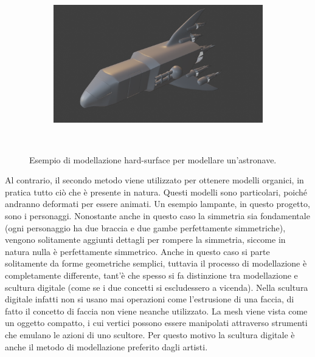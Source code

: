 \begin{figure}
\begin{subfigure}{.5\textwidth}
\end{subfigure}%
\begin{subfigure}{.5\textwidth}
  \centering
  \includegraphics[width=.99\linewidth]{Figures/box4.png}
\end{subfigure}\\[2ex]
\decoRule
\caption[Modellazione hard-surface]{Esempio di modellazione hard-surface per modellare un'astronave.}
\label{fig:box-model}
\end{figure}

Al contrario, il secondo metodo viene utilizzato per ottenere modelli organici, in pratica tutto ciò che è presente in natura.
Questi modelli sono particolari, poiché andranno deformati per essere animati.
Un esempio lampante, in questo progetto, sono i personaggi.
Nonostante anche in questo caso la simmetria sia fondamentale (ogni personaggio ha due braccia e due gambe perfettamente simmetriche), vengono solitamente aggiunti dettagli per rompere la simmetria, siccome in natura nulla è perfettamente simmetrico.
Anche in questo caso si parte solitamente da forme geometriche semplici, tuttavia il processo di modellazione è completamente differente, tant'è che spesso si fa distinzione tra modellazione e scultura digitale (come se i due concetti si escludessero a vicenda).
Nella scultura digitale infatti non si usano mai operazioni come l'estrusione di una faccia, di fatto il concetto di faccia non viene neanche utilizzato.
La mesh viene vista come un oggetto compatto, i cui vertici possono essere manipolati attraverso strumenti che emulano le azioni di uno scultore.
Per questo motivo la scultura digitale è anche il metodo di modellazione preferito dagli artisti.
\newline

